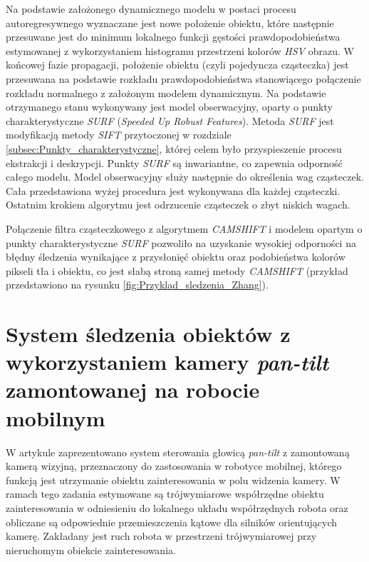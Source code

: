 {Na podstawie założonego dynamicznego modelu w postaci procesu autoregresywnego wyznaczane jest nowe położenie obiektu, które następnie przesuwane jest do minimum lokalnego funkcji gęstości prawdopodobieństwa estymowanej z wykorzystaniem histogramu przestrzeni kolorów \textit{HSV} obrazu. W końcowej fazie propagacji, położenie obiektu (czyli pojedyncza cząsteczka) jest przesuwana na podstawie rozkładu prawdopodobieństwa stanowiącego połączenie rozkładu normalnego z założonym modelem dynamicznym. Na podstawie otrzymanego stanu wykonywany jest model obserwacyjny, oparty o punkty charakterystyczne \textit{SURF} (\textit{Speeded Up Robust Features}). Metoda \textit{SURF} jest modyfikacją metody \textit{SIFT} przytoczonej w rozdziale \ref{subsec:Punkty_charakterystyczne}, której celem było przyspieszenie procesu ekstrakcji i deskrypcji. Punkty \textit{SURF} są inwariantne, co zapewnia odporność całego modelu. Model obserwacyjny służy następnie do określenia wag cząsteczek. Cała przedstawiona wyżej procedura jest wykonywana dla każdej cząsteczki.  Ostatnim krokiem algorytmu jest odrzucenie cząsteczek o zbyt niskich wagach.

Połączenie filtra cząsteczkowego z algorytmem \textit{CAMSHIFT} i modelem opartym o punkty charakterystyczne \textit{SURF} pozwoliło na uzyskanie wysokiej odporności na błędny śledzenia wynikające z przysłonięć obiektu oraz podobieństwa kolorów pikseli tła i obiektu, co jest słabą stroną samej metody \textit{CAMSHIFT} (przykład przedstawiono na rysunku \ref{fig:Przyklad_sledzenia_Zhang}).

\section{System śledzenia obiektów z wykorzystaniem kamery \textit{pan-tilt} zamontowanej na robocie mobilnym}
\label{sec:Przyklad_Kim}

W artykule \cite{Kim2012} zaprezentowano system sterowania głowicą \textit{pan-tilt} z zamontowaną kamerą wizyjną, przeznaczony do zastosowania w robotyce mobilnej, którego funkcją jest utrzymanie obiektu zainteresowania w polu widzenia kamery. W ramach tego zadania estymowane są trójwymiarowe współrzędne obiektu zainteresowania w odniesieniu do lokalnego układu współrzędnych robota oraz obliczane są odpowiednie przemieszczenia kątowe dla silników orientujących kamerę. Zakładany jest ruch robota w przestrzeni trójwymiarowej przy nieruchomym obiekcie zainteresowania.

}
